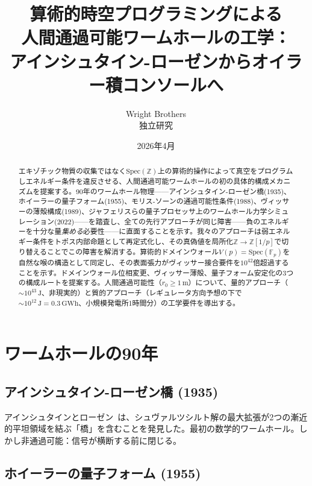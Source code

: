 \documentclass[11pt,a4paper]{article}
\newcommand{\Spec}{\mathrm{Spec}}
\newcommand{\Zp}{\mathbb{Z}[1/p]}
\begin{document}
\title{算術的時空プログラミングによる\\人間通過可能ワームホールの工学：\\アインシュタイン-ローゼンからオイラー積コンソールへ}
\author{Wright Brothers\\{\small 独立研究}}
\date{2026年4月}
\maketitle

\begin{abstract}
エキゾチック物質の収集ではなく$\Spec(\mathbb{Z})$上の算術的操作によって真空をプログラムしエネルギー条件を違反させる、人間通過可能ワームホールの初の具体的構成メカニズムを提案する。90年のワームホール物理——アインシュタイン-ローゼン橋(1935)、ホイーラーの量子フォーム(1955)、モリス-ソーンの通過可能性条件(1988)、ヴィッサーの薄殻構成(1989)、ジャフェリスらの量子プロセッサ上のワームホール力学シミュレーション(2022)——を踏査し、全ての先行アプローチが同じ障害——負のエネルギーを十分な量\emph{集める}必要性——に直面することを示す。我々のアプローチは弱エネルギー条件をトポス内部命題として再定式化し、その真偽値を局所化$\mathbb{Z} \to \Zp$で切り替えることでこの障害を解消する。算術的ドメインウォール$V(p) = \Spec(\mathbb{F}_p)$を自然な喉の構造として同定し、その表面張力がヴィッサー接合要件を$10^{42}$倍超過することを示す。ドメインウォール位相変更、ヴィッサー薄殻、量子フォーム安定化の3つの構成ルートを提案する。人間通過可能性（$r_0 \geq 1\,\mathrm{m}$）について、量的アプローチ（$\sim 10^{43}\,\mathrm{J}$、非現実的）と質的アプローチ（レギュレータ方向予想の下で$\sim 10^{12}\,\mathrm{J} = 0.3\,\mathrm{GWh}$、小規模発電所1時間分）の工学要件を導出する。
\end{abstract}

\section{ワームホールの90年}

\subsection{アインシュタイン-ローゼン橋 (1935)}

アインシュタインとローゼン~\cite{EinsteinRosen1935}は、シュヴァルツシルト解の最大拡張が2つの漸近的平坦領域を結ぶ「橋」を含むことを発見した。最初の数学的ワームホール。しかし非通過可能：信号が横断する前に閉じる。

\subsection{ホイーラーの量子フォーム (1955)}
\end{document}
